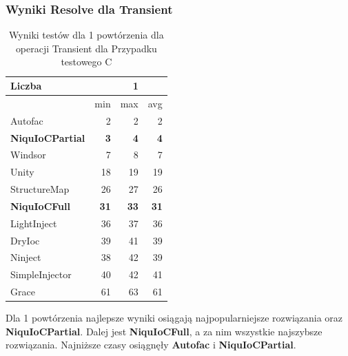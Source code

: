 \documentclass[12pt]{article}
\begin{document}
\subsubsection{Wyniki Resolve dla Transient}
\begin{table}[H]
\captionsetup{belowskip=0pt,aboveskip=0pt}
\begin{center}
\begin{small}
	\begin{tabular}{ | l | r r r | }
    		\hline
Liczba & & 1 & \\ \hline
 & min & max & avg \\ \hline
Autofac & 2 & 2 & 2 \\ \hline
\textbf{NiquIoCPartial} & \textbf{3} & \textbf{4} & \textbf{4} \\ \hline
Windsor & 7 & 8 & 7 \\ \hline
Unity & 18 & 19 & 19 \\ \hline
StructureMap & 26 & 27 & 26 \\ \hline
\textbf{NiquIoCFull} & \textbf{31} & \textbf{33} & \textbf{31} \\ \hline
LightInject & 36 & 37 & 36 \\ \hline
DryIoc & 39 & 41 & 39 \\ \hline
Ninject & 38 & 42 & 39 \\ \hline
SimpleInjector & 40 & 42 & 41 \\ \hline
Grace & 61 & 63 & 61 \\ \hline
  	\end{tabular}
\end{small}
\end{center}
\caption{Wyniki testów dla 1 powtórzenia dla operacji Transient dla Przypadku testowego C}
\label{TestCaseC_Transient1}
\end{table}
Dla 1 powtórzenia najlepsze wyniki osiągają najpopularniejsze rozwiązania oraz \textbf{NiquIoCPartial}. Dalej jest \textbf{NiquIoCFull}, a za nim wszystkie najszybsze rozwiązania. Najniższe czasy osiągnęły \textbf{Autofac} i \textbf{NiquIoCPartial}.
\\ \\
\end{document}
